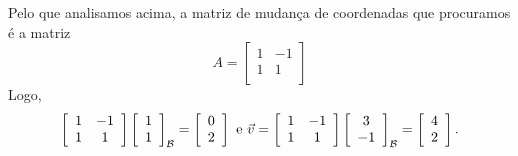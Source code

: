 \documentclass[../livro.tex]{subfiles}  %
\begin{document}
\begin{example}
	Pelo que analisamos acima, a matriz de mudança de coordenadas que procuramos é a matriz
	\[
	A = 
	\left[
	\begin{array}{cc}
	1 & -1 \\
	1 &  1 \\
	\end{array}
	\right]
	\] Logo,
	\[
	\left[
	\begin{array}{cc}
	1 & -1 \\
	1 &  1 \\
	\end{array}
	\right] \left[
	\begin{array}{c}
	1 \\
	1 \\
	\end{array}
	\right]_{\mathcal{B}} = 
	\left[
	\begin{array}{c}
	0 \\
	2 \\
	\end{array}
	\right] \text{ e } \vec{v} = 
	\left[
	\begin{array}{cc}
	1 & -1 \\
	1 &  1 \\
	\end{array}
	\right] \left[
	\begin{array}{c}
	3 \\
	-1 \\
	\end{array}
	\right]_{\mathcal{B}} =
	\left[
	\begin{array}{c}
	4 \\
	2 \\
	\end{array}
	\right].
	\]
\end{example}
\end{document}
